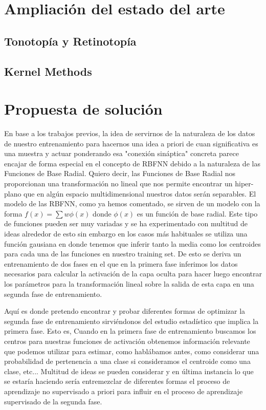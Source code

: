 \documentclass[10pt,a4paper, twocolumn]{report}
\begin{document}
\section{Ampliación del estado del arte}
\subsection{Tonotopía y Retinotopía}
\subsection{Kernel Methods}
\section{Propuesta de solución}
En base a los trabajos previos, la idea de servirnos de la naturaleza de los datos de nuestro entrenamiento para hacernos una idea a priori de cuan significativa es una muestra y actuar ponderando esa "conexión sináptica" concreta parece encajar de forma especial en el concepto de RBFNN debido a la naturaleza de las Funciones de Base Radial. Quiero decir, las Funciones de Base Radial nos proporcionan una transformación no lineal que nos permite encontrar un hiper-plano que en algún espacio multidimensional nuestros datos serán separables. El modelo de las RBFNN, como ya hemos comentado, se sirven de un modelo con la forma $f(x)=\sum w \phi(x)$ donde $\phi(x)$ es un función de base radial. Este tipo de funciones pueden ser muy variadas y se ha experimentado con multitud de ideas alrededor de esto sin embargo en los casos más habituales se utiliza una función gausiana en donde tenemos que inferir tanto la media como los centroides para cada una de las funciones en nuestro training set. De esto se deriva un entrenamiento de dos fases en el que en la primera fase inferimos los datos necesarios para calcular la activación de la capa oculta para hacer luego encontrar los parámetros para la transformación lineal sobre la salida de esta capa en una segunda fase de entrenamiento.

Aquí es donde pretendo encontrar y probar diferentes formas de optimizar la segunda fase de entrenamiento sirviéndonos del estudio estadístico que implica la primera fase. Esto es, Cuando en la primera fase de entrenamiento buscamos los centros para nuestras funciones de activación obtenemos información relevante que podemos utilizar para estimar, como hablábamos antes, como considerar una probabilidad de pertenencia a una clase si consideramos el centroide como una clase, etc... Multitud de ideas se pueden considerar y en última instancia lo que se estaría haciendo sería entremezclar de diferentes formas el proceso de aprendizaje no supervisado a priori para influir en el proceso de aprendizaje supervisado de la segunda fase.
\end{document}
